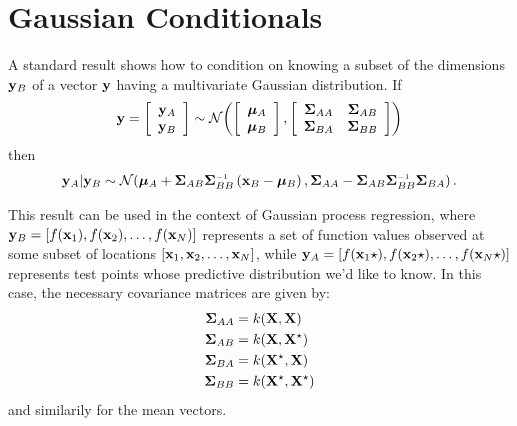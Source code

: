 
\inbpdocument

\chapter{Gaussian Conditionals}
\label{ch:appendix-gaussians}


A standard result shows how to condition on knowing a subset of the dimensions ${\bf{y}}_B$ of a vector ${\bf{y}}$ having a multivariate Gaussian distribution.
If
%
\begin{align}
{\bf{y}} = \left[ \begin{array}{c} {{\bf{y}}_A} \\ {{\bf{y}}_B} \end{array} \right] \sim \mathcal{N}\!\left(\left[ \begin{array}{c} {{\boldsymbol{\mu}}_A} \\ {{\boldsymbol{\mu}}_B} \end{array} \right],\left[ \begin{array}{cc}\mathbf{\Sigma}_{AA} & \mathbf{\Sigma}_{AB} \\ \mathbf{\Sigma}_{BA} & \mathbf{\Sigma}_{BB} \end{array} \right]\right)
\end{align}
%
then
%
\begin{align}
\vy_A | \vy_B \sim \Nt{\vmu_A + \vSigma_{AB} \vSigma_{BB}\inv \left( \vx_B - \vmu_B \right) }
{\vSigma_{AA} - \vSigma_{AB} \vSigma_{BB}\inv \vSigma_{BA} }.
\label{eq:gauss_conditional}
\end{align}

This result can be used in the context of Gaussian process regression, where ${\bf{y}}_B = [f({\bf{x}}_1), f({\bf{x}}_2), \dots, f({\bf{x}}_N)]$ represents a set of function values observed at some subset of locations $[{\bf{x}}_1, {\bf{x}}_2, \dots, {\bf{x}}_N]$, while ${\bf{y}}_A = [f({\bf{x}}_1\star), f({\bf{x}}_2\star), \ldots, f({\bf{x}}_N\star)]$ represents test points whose predictive distribution we'd like to know.
In this case, the necessary covariance matrices are given by:
%
\begin{align}
\mathbf{\Sigma}_{AA} & = k(\mathbf{X}, \mathbf{X}) \\
\mathbf{\Sigma}_{AB} & = k(\mathbf{X}, \mathbf{X}^\star) \\
\mathbf{\Sigma}_{BA} & = k(\mathbf{X}^\star, \mathbf{X}) \\
\mathbf{\Sigma}_{BB} & = k(\mathbf{X}^\star, \mathbf{X}^\star)
\end{align}
and similarily for the mean vectors.






